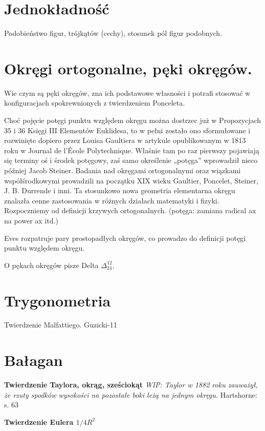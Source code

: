 %

\section{Jednokładność}
Podobieństwo figur, trójkątów (cechy), stosunek pól figur podobnych.


\section{Okręgi ortogonalne, pęki okręgów.}
Wie czym są pęki okręgów, zna ich podstawowe własności i potrafi stosować w konfiguracjach spokrewnionych z twierdzeniem Ponceleta.   

Choć pojęcie potęgi punktu względem okręgu można dostrzec już w Propozycjach 35 i 36 Księgi III Elementów Euklidesa, to w pełni zostało ono sformułowane i rozwinięte dopiero przez Louisa Gaultiera w artykule opublikowanym w 1813 roku w Journal de l'École Polytechnique. Właśnie tam po raz pierwszy pojawiają się terminy oś i środek potęgowy, zaś samo określenie „potęga” wprowadził nieco później Jacob Steiner. Badania nad okręgami ortogonalnymi oraz wiązkami współśrodkowymi prowadzili na początku XIX wieku Gaultier, Poncelet, Steiner, J. B. Durrende i inni. Ta stosunkowo nowa geometria elementarna okręgu znalazła cenne zastosowania w różnych działach matematyki i fizyki. Rozpoczniemy od definicji krzywych ortogonalnych. (potęga: zamiana radical ax na power ax itd.)

Eves \cite[s. 88-90]{eves1_1972} rozpatruje pary prostopadłych okręgów, co prowadzo do definicji potęgi punktu względem okręgu.

O pękach okręgów pisze Delta $\Delta_{24}^{12}$.



\section{Trygonometria}


Twierdzenie Malfattiego.
Guzicki-11

\section{Bałagan}

\textbf{Twierdzenie Taylora, okrąg, sześciokąt}
{
    \emph{WIP: Taylor w 1882 roku zauważył, że rzuty spodków wysokości na pozostałe boki leżą na jednym okręgu.}
	Hartshorne: s. 63
}

\textbf{Twierdzenie Eulera $1/4R^2$}



%